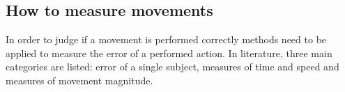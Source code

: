 \subsection{How to measure movements}
In order to judge if a movement is performed correctly methods need to be applied to measure the error of a performed action. In literature, three main categories are listed: error of a single subject, measures of time and speed and measures of movement magnitude. 
